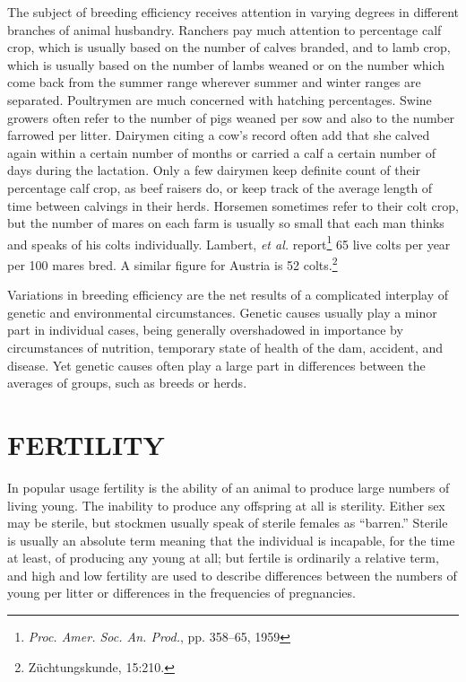 The subject of breeding efficiency receives attention in varying
degrees in different branches of animal husbandry. Ranchers pay much
attention to percentage calf crop, which is usually based on the number
of calves branded, and to lamb crop, which is usually based on the
number of lambs weaned or on the number which come back from the
summer range wherever summer and winter ranges are separated.
Poultrymen are much concerned with hatching percentages. Swine
growers often refer to the number of pigs weaned per sow and also to
the number farrowed per litter. Dairymen citing a cow's record often
add that she calved again within a certain number of months or carried
a calf a certain number of days during the lactation. Only a few dairymen
keep definite count of their percentage calf crop, as beef raisers do,
or keep track of the average length of time between calvings in their
herds. Horsemen sometimes refer to their colt crop, but the number of
mares on each farm is usually so small that each man thinks and speaks
of his colts individually. Lambert, \textit{et al.}
report\footnote{\textit{Proc. Amer. Soc. An. Prod.}, pp. 358--65, 1959}
65 live colts per year per 100 mares bred. A similar figure for Austria
is 52 colts.\footnote{Z\"uchtungskunde, 15:210.}

Variations in breeding efficiency are the net results of a complicated
interplay of genetic and environmental circumstances. Genetic causes
usually play a minor part in individual cases, being generally overshadowed
in importance by circumstances of nutrition, temporary state of
health of the dam, accident, and disease. Yet genetic causes often play a
large part in differences between the averages of groups, such as breeds
or herds.

\section*{FERTILITY}

In popular usage fertility is the ability of an animal to produce large
numbers of living young. The inability to produce any offspring at all
is sterility. Either sex may be sterile, but stockmen usually speak of
sterile females as ``barren.'' Sterile is usually an absolute term meaning
that the individual is incapable, for the time at least, of producing any
young at all; but fertile is ordinarily a relative term, and high and low
fertility are used to describe differences between the numbers of young
per litter or differences in the frequencies of pregnancies.

